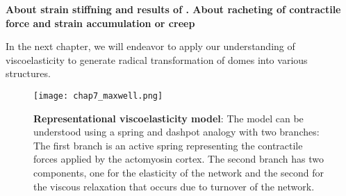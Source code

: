 \textbf{About strain stiffning and results of \cite{duque2023}. About racheting of contractile force \cite{clement2017, mason2011} and strain accumulation or creep}

In the next chapter, we will endeavor to apply our understanding of viscoelasticity to generate radical transformation of domes into various structures.

\begin{figure}
	\centering
	\texttt{[image: chap7\_maxwell.png]}
	\caption{\label{fig_7_9} \textbf{Representational viscoelasticity model}: The model can be understood using a spring and dashpot analogy with two branches: The first branch is an active spring representing the contractile forces applied by the actomyosin cortex. The second branch has two components, one for the elasticity of the network and the second for the viscous relaxation that occurs due to turnover of the network.
	}
\end{figure}